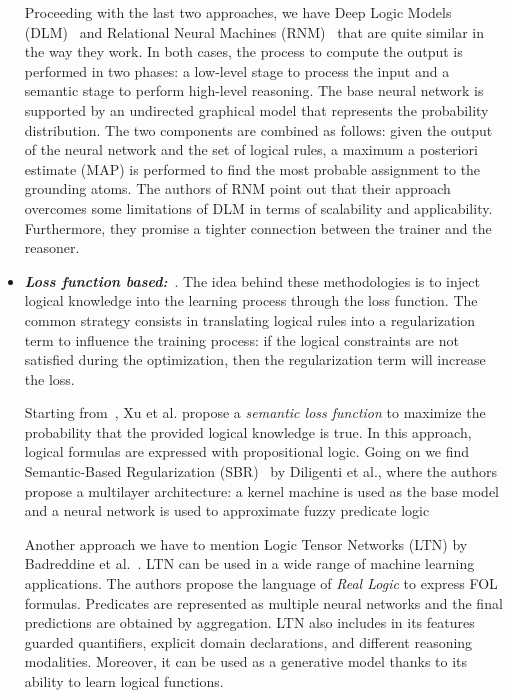 \begin{itemize}
    Proceeding with the last two approaches, we have Deep Logic Models (DLM)~\cite{dlm} and Relational Neural Machines (RNM)~\cite{rnm} that are quite similar in the way they work. In both cases, the process to compute the output is performed in two phases: a low-level stage to process the input and a semantic stage to perform high-level reasoning. The base neural network is supported by an undirected graphical model that represents the probability distribution. The two components are combined as follows: given the output of the neural network and the set of logical rules, a maximum a posteriori estimate (MAP) is performed to find the most probable assignment to the grounding atoms. The authors of RNM point out that their approach overcomes some limitations of DLM in terms of scalability and applicability. Furthermore, they promise a tighter connection between the trainer and the reasoner.
    
    \item \textbf{\textit{Loss function based:}}~\cite{lyrics,marra2019t,dl2,ltn,sbr,semanticLoss,harnessingDeepNeuralNetworks}. The idea behind these methodologies is to inject logical knowledge into the learning process through the loss function. The common strategy consists in translating logical rules into a regularization term to influence the training process: if the logical constraints are not satisfied during the optimization, then the regularization term will increase the loss.
    
    Starting from~\cite{semanticLoss}, Xu et al. propose a \textit{semantic loss function} to maximize the probability that the provided logical knowledge is true. In this approach, logical formulas are expressed with propositional logic. Going on we find Semantic-Based Regularization (SBR)~\cite{sbr} by Diligenti et al., where the authors propose a multilayer architecture: a kernel machine is used as the base model and a neural network is used to approximate fuzzy predicate logic
    
    Another approach we have to mention Logic Tensor Networks (LTN) by Badreddine et al.~\cite{ltn}. LTN can be used in a wide range of machine learning applications. The authors propose the language of \textit{Real Logic} to express FOL formulas. Predicates are represented as multiple neural networks and the final predictions are obtained by aggregation. LTN also includes in its features guarded quantifiers, explicit domain declarations, and different reasoning modalities. Moreover, it can be used as a generative model thanks to its ability to learn logical functions.
    

\end{itemize}
